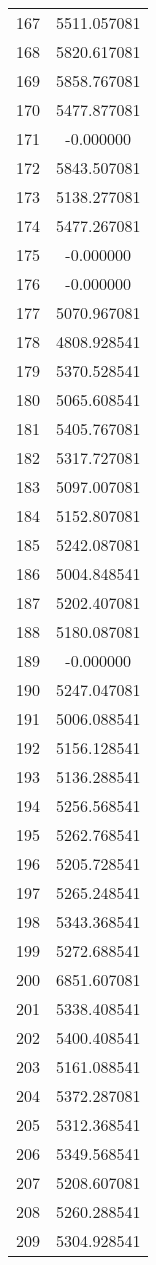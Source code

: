 \documentclass[12pt]{article}
\begin{document}
\begin{longtable}{@{}cc@{}}
167 & 5511.057081 \\
168 & 5820.617081 \\
169 & 5858.767081 \\
170 & 5477.877081 \\
171 & -0.000000 \\
172 & 5843.507081 \\
173 & 5138.277081 \\
174 & 5477.267081 \\
175 & -0.000000 \\
176 & -0.000000 \\
177 & 5070.967081 \\
178 & 4808.928541 \\
179 & 5370.528541 \\
180 & 5065.608541 \\
181 & 5405.767081 \\
182 & 5317.727081 \\
183 & 5097.007081 \\
184 & 5152.807081 \\
185 & 5242.087081 \\
186 & 5004.848541 \\
187 & 5202.407081 \\
188 & 5180.087081 \\
189 & -0.000000 \\
190 & 5247.047081 \\
191 & 5006.088541 \\
192 & 5156.128541 \\
193 & 5136.288541 \\
194 & 5256.568541 \\
195 & 5262.768541 \\
196 & 5205.728541 \\
197 & 5265.248541 \\
198 & 5343.368541 \\
199 & 5272.688541 \\
200 & 6851.607081 \\
201 & 5338.408541 \\
202 & 5400.408541 \\
203 & 5161.088541 \\
204 & 5372.287081 \\
205 & 5312.368541 \\
206 & 5349.568541 \\
207 & 5208.607081 \\
208 & 5260.288541 \\
209 & 5304.928541 \\

\end{longtable}
\end{document}
